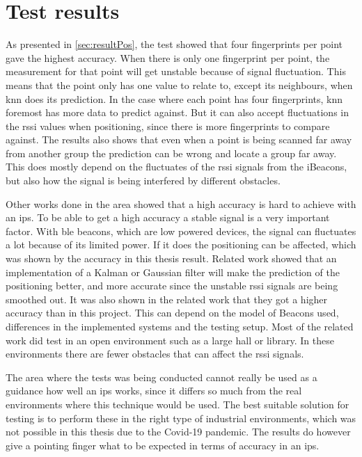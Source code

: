 \section{Test results}\label{sec:discussionResult}
As presented in \cref{sec:resultPos}, the test showed that four fingerprints per point gave the highest accuracy.
When there is only one fingerprint per point, the measurement for that point will get unstable because of signal fluctuation.
This means that the point only has one value to relate to, except its neighbours, when \acrshort{knn} does its prediction.
In the case where each point has four fingerprints, \acrshort{knn} foremost has more data to predict against.
But it can also accept fluctuations in the \acrfull{rssi} values when positioning, since there is more fingerprints to compare against.
The results also shows that even when a point is being scanned far away from another group the prediction can be wrong and locate a group far away.
This does mostly depend on the fluctuates of the \acrshort{rssi} signals from the iBeacons, but also how the signal is being interfered by different obstacles.

\bigskip

Other works done in the area showed that a high accuracy is hard to achieve with an \acrshort{ips}.
To be able to get a high accuracy a stable signal is a very important factor.
With \acrlong{ble} beacons, which are low powered devices, the signal can fluctuates a lot because of its limited power.
If it does the positioning can be affected, which was shown by the accuracy in this thesis result.
Related work  showed that an implementation of a Kalman or Gaussian filter will make the prediction of the positioning better, and more accurate since the unstable \acrshort{rssi} signals are being smoothed out.
It was also shown in the related work that they got a higher accuracy than in this project.
This can depend on the model of Beacons used, differences in the implemented systems and the testing setup.
Most of the related work did test in an open environment such as a large hall or library.
In these environments there are fewer obstacles that can affect the \acrshort{rssi} signals.

\bigskip

The area where the tests was being conducted cannot really be used as a guidance how well an \acrshort{ips} works, since it differs so much from the real environments where this technique would be used.
The best suitable solution for testing is to perform these in the right type of industrial environments, which was not possible in this thesis due to the Covid-19 pandemic.
The results do however give a pointing finger what to be expected in terms of accuracy in an \acrshort{ips}.


